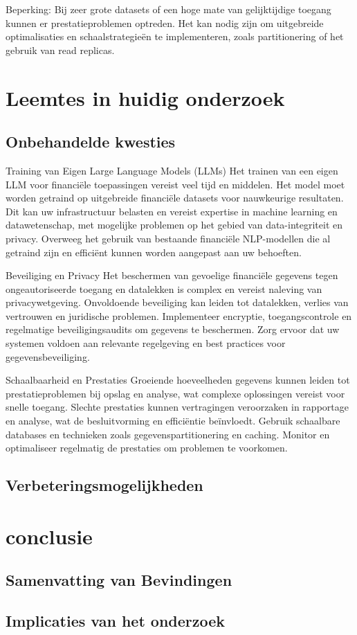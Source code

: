Beperking: Bij zeer grote datasets of een hoge mate van gelijktijdige toegang kunnen er prestatieproblemen optreden. Het kan nodig zijn om uitgebreide optimalisaties en schaalstrategieën te implementeren, zoals partitionering of het gebruik van read replicas.
\section{Leemtes in huidig onderzoek}
\subsection{Onbehandelde kwesties}
Training van Eigen Large Language Models (LLMs)
Het trainen van een eigen LLM voor financiële toepassingen vereist veel tijd en middelen. Het model moet worden getraind op uitgebreide financiële datasets voor nauwkeurige resultaten. Dit kan uw infrastructuur belasten en vereist expertise in machine learning en datawetenschap, met mogelijke problemen op het gebied van data-integriteit en privacy. Overweeg het gebruik van bestaande financiële NLP-modellen die al getraind zijn en efficiënt kunnen worden aangepast aan uw behoeften.

Beveiliging en Privacy
Het beschermen van gevoelige financiële gegevens tegen ongeautoriseerde toegang en datalekken is complex en vereist naleving van privacywetgeving. Onvoldoende beveiliging kan leiden tot datalekken, verlies van vertrouwen en juridische problemen. Implementeer encryptie, toegangscontrole en regelmatige beveiligingsaudits om gegevens te beschermen. Zorg ervoor dat uw systemen voldoen aan relevante regelgeving en best practices voor gegevensbeveiliging.

Schaalbaarheid en Prestaties
Groeiende hoeveelheden gegevens kunnen leiden tot prestatieproblemen bij opslag en analyse, wat complexe oplossingen vereist voor snelle toegang. Slechte prestaties kunnen vertragingen veroorzaken in rapportage en analyse, wat de besluitvorming en efficiëntie beïnvloedt. Gebruik schaalbare databases en technieken zoals gegevenspartitionering en caching. Monitor en optimaliseer regelmatig de prestaties om problemen te voorkomen.

\subsection{Verbeteringsmogelijkheden}

\section{conclusie}
\subsection{Samenvatting van Bevindingen}
\subsection{Implicaties van het onderzoek}

